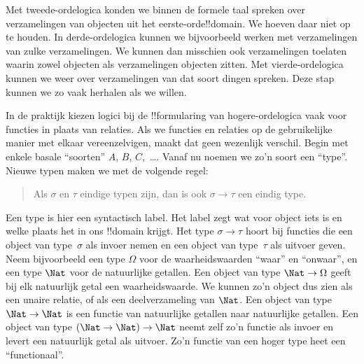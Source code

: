 \documentclass[../../../include/open-logic-section]{subfiles}
\begin{document}


Met tweede-ordelogica konden we binnen de formele taal spreken over
verzamelingen van objecten uit het eerste-orde!!{domain}. We hoeven daar niet
op te houden. In derde-ordelogica kunnen we bijvoorbeeld werken met
verzamelingen van zulke verzamelingen. We kunnen dan misschien ook
verzamelingen toelaten waarin zowel objecten als verzamelingen objecten zitten.
Met vierde-ordelogica kunnen we weer over verzamelingen van dat soort dingen
spreken. Deze stap kunnen we zo vaak herhalen als we willen.

In de praktijk kiezen logici bij de !!{formula}ring van hogere-ordelogica vaak
voor functies in plaats van relaties. Als we functies en relaties op de
gebruikelijke manier met elkaar vereenzelvigen, maakt dat geen wezenlijk
verschil. Begin met enkele basale ``soorten'' $A$, $B$, $C$,~\dots. Vanaf nu
noemen we zo'n soort een ``type''. Nieuwe typen maken we met de volgende regel:
\begin{quote}
Als $\sigma$ en $\tau$ eindige typen zijn, dan is ook $\sigma \to \tau$ een
eindig type.
\end{quote}
Een type is hier een syntactisch label. Het label zegt wat voor object iets is
en welke plaats het in ons !!{domain} krijgt. Het type $\sigma \to \tau$ hoort
bij functies die een object van type~$\sigma$ als invoer nemen en een object
van type~$\tau$ als uitvoer geven. Neem bijvoorbeeld een type $\Omega$ voor de
waarheidswaarden ``waar'' en ``onwaar'', en een type $\Nat$ voor de natuurlijke
getallen. Een object van type $\Nat \to \Omega$ geeft bij elk natuurlijk getal
een waarheidswaarde. We kunnen zo'n object dus zien als een unaire relatie, of
als een deelverzameling van $\Nat$. Een object van type $\Nat \to \Nat$ is een
functie van natuurlijke getallen naar natuurlijke getallen. Een object van
type $(\Nat \to \Nat) \to \Nat$ neemt zelf zo'n functie als invoer en levert
een natuurlijk getal als uitvoer. Zo'n functie van een hoger type heet een
``functionaal''.
\end{document}
